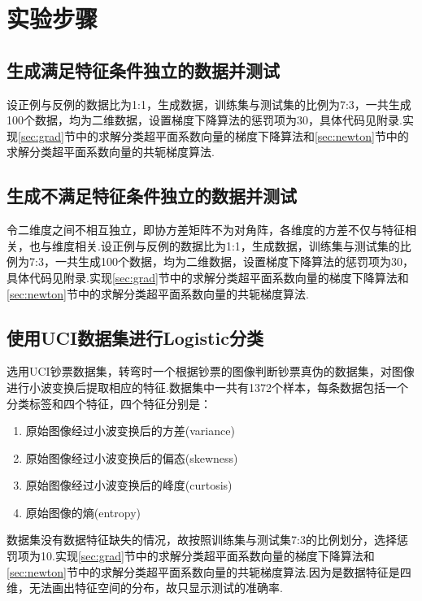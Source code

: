 \documentclass{hitreport}
\begin{document}
\section{实验步骤}

\subsection{生成满足特征条件独立的数据并测试}

设正例与反例的数据比为1:1，生成数据，训练集与测试集的比例为7:3，一共生成100个数据，均为二维数据，设置梯度下降算法的惩罚项为30，具体代码见附录.实现\ref{sec:grad}节中的求解分类超平面系数向量的梯度下降算法和\ref{sec:newton}节中的求解分类超平面系数向量的共轭梯度算法.

%

\subsection{生成不满足特征条件独立的数据并测试}

令二维度之间不相互独立，即协方差矩阵不为对角阵，各维度的方差不仅与特征相关，也与维度相关.设正例与反例的数据比为1:1，生成数据，训练集与测试集的比例为7:3，一共生成100个数据，均为二维数据，设置梯度下降算法的惩罚项为30，具体代码见附录.实现\ref{sec:grad}节中的求解分类超平面系数向量的梯度下降算法和\ref{sec:newton}节中的求解分类超平面系数向量的共轭梯度算法.

%

\subsection{使用UCI数据集进行Logistic分类}

选用UCI钞票数据集，转弯时一个根据钞票的图像判断钞票真伪的数据集，对图像进行小波变换后提取相应的特征.数据集中一共有1372个样本，每条数据包括一个分类标签和四个特征，四个特征分别是：
\begin{enumerate}
\item 原始图像经过小波变换后的方差(variance)
\item 原始图像经过小波变换后的偏态(skewness)
\item 原始图像经过小波变换后的峰度(curtosis)
\item 原始图像的熵(entropy)
\end{enumerate}

数据集没有数据特征缺失的情况，故按照训练集与测试集7:3的比例划分，选择惩罚项为10.实现\ref{sec:grad}节中的求解分类超平面系数向量的梯度下降算法和\ref{sec:newton}节中的求解分类超平面系数向量的共轭梯度算法.因为是数据特征是四维，无法画出特征空间的分布，故只显示测试的准确率.
\end{document}
